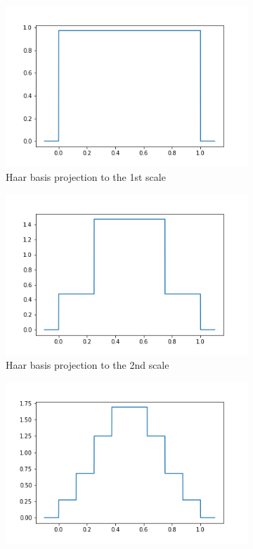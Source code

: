 \documentclass[../Thesis.tex]{subfiles}
\begin{document}
\begin{figure}[h!]
  \centering
  \begin{subfigure}[b]{0.49\linewidth}
    \includegraphics[width=\linewidth]{img/scale1.png}
    \caption{Haar basis projection to the 1st scale}
  \end{subfigure}
  \begin{subfigure}[b]{0.49\linewidth}
    \includegraphics[width=\linewidth]{img/scale2.png}
    \caption{Haar basis projection to the 2nd scale}
  \end{subfigure}
  \begin{subfigure}[b]{0.49\linewidth}
    \includegraphics[width=\linewidth]{img/scale3.png}

\end{subfigure}
\end{figure}
\end{document}
